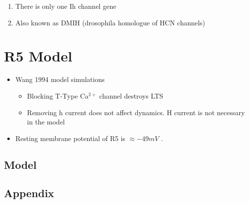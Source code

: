 \documentclass[../../workflow.tex]{subfiles}
\begin{document}
\color{red}
    \begin{enumerate}
        \item There is only one Ih channel gene \parencite{chenFunctionalStudyHyperpolarization2012,gisselmannVariantsDrosophilaMelanogaster2005}
        \item Also known as DMIH (drosophila homologue of HCN channels)
    \end{enumerate}

\color{black}

\section{R5 Model}
\etocignoretoctocdepth %
\etocsettocstyle{\subsection*{\contentsname}}{}
\localtableofcontents

\color{red}
\begin{itemize}
    \item Wang 1994 model simulations
    \begin{itemize}
        \item Blocking T-Type Ca$^{2+}$ channel destroys LTS
        \item Removing h current does not affect dynamics. H current is not
        necessary in the model
    \end{itemize}

    \item Resting membrane potential of R5 is $\approx -49 mV$ \parencite{raccugliaNetworkSpecificSynchronizationElectrical2019}.
\end{itemize}

\color{black}

\subsection{Model}

\newpage
\subsection{Appendix}
\end{document}
